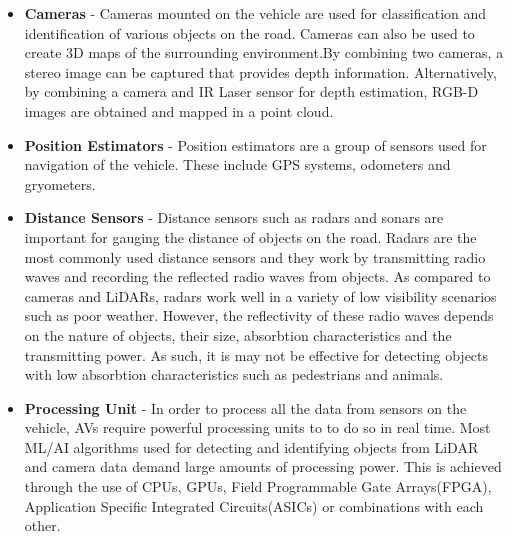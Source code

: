 \begin{itemize}
	\item \textbf{Cameras} - Cameras mounted on the vehicle are used for classification and identification of various objects on the road. 
	Cameras can also be used to create 3D maps of the surrounding environment.By combining two cameras, a stereo image can be captured that provides depth information. Alternatively, by combining a camera and IR Laser sensor for depth estimation, RGB-D \cite{henry2010rgb} images are obtained and mapped in a point cloud.
	
	\item \textbf{Position Estimators} - Position estimators are a group of sensors used for navigation of the vehicle. These include GPS systems, odometers and gryometers. 
	\item \textbf{Distance Sensors} - Distance sensors such as radars and sonars are important for gauging the distance of objects on the road. 
	Radars are the most commonly used distance sensors and they work by transmitting radio waves and recording the reflected radio waves from objects. As compared to cameras and LiDARs, radars work well in a variety of low visibility scenarios such as poor weather. 
	However, the reflectivity of these radio waves depends on the nature of objects, their size, absorbtion characteristics and the transmitting power. As such, it is may not be effective for detecting objects with low absorbtion characteristics such as pedestrians and animals.
	
	\item \textbf{Processing Unit} - In order to process all the data from sensors on the vehicle, AVs require powerful processing units to to do so in real time. Most ML/AI algorithms used for detecting and identifying objects from LiDAR and camera data demand large amounts of processing power. This is achieved through the use of CPUs, GPUs, Field Programmable Gate Arrays(FPGA)\cite{brown2012field}, Application Specific Integrated Circuits(ASICs)\cite{smith1997application} or combinations with each other. 

\end{itemize}


